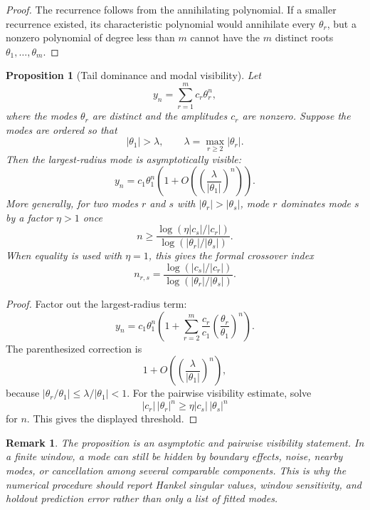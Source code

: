 \documentclass[10pt,twocolumn]{article}
\newtheorem{proposition}{Proposition}
\newtheorem{remark}{Remark}
\begin{document}
\begin{proof}
The recurrence follows from the annihilating polynomial. If a smaller
recurrence existed, its characteristic polynomial would annihilate every
\(\theta_r\), but a nonzero polynomial of degree less than \(m\) cannot have
the \(m\) distinct roots \(\theta_1,\ldots,\theta_m\).
\end{proof}

\begin{proposition}[Tail dominance and modal visibility]
Let
\[
        y_n=\sum_{r=1}^{m}c_r\theta_r^n,
\]
where the modes \(\theta_r\) are distinct and the amplitudes \(c_r\) are
nonzero. Suppose the modes are ordered so that
\[
        |\theta_1|>\lambda,
        \qquad
        \lambda=\max_{r\ge2}|\theta_r|.
\]
Then the largest-radius mode is asymptotically visible:
\[
        y_n
        =
        c_1\theta_1^n
        \left(
        1+O\left(\left(\frac{\lambda}{|\theta_1|}\right)^n\right)
        \right).
\]
More generally, for two modes \(r\) and \(s\) with
\(|\theta_r|>|\theta_s|\), mode \(r\) dominates mode \(s\) by a factor
\(\eta>1\) once
\[
        n
        \ge
        \frac{\log(\eta |c_s|/|c_r|)}
             {\log(|\theta_r|/|\theta_s|)}.
\]
When equality is used with \(\eta=1\), this gives the formal crossover index
\[
        n_{r,s}
        =
        \frac{\log(|c_s|/|c_r|)}
             {\log(|\theta_r|/|\theta_s|)}.
\]
\end{proposition}

\begin{proof}
Factor out the largest-radius term:
\[
        y_n
        =
        c_1\theta_1^n
        \left(
        1+\sum_{r=2}^{m}
        \frac{c_r}{c_1}\left(\frac{\theta_r}{\theta_1}\right)^n
        \right).
\]
The parenthesized correction is
\[
        1+O\left(\left(\frac{\lambda}{|\theta_1|}\right)^n\right),
\]
because \(|\theta_r/\theta_1|\le \lambda/|\theta_1|<1\). For the pairwise
visibility estimate, solve
\[
        |c_r|\,|\theta_r|^n
        \ge
        \eta |c_s|\,|\theta_s|^n
\]
for \(n\). This gives the displayed threshold.
\end{proof}

\begin{remark}
The proposition is an asymptotic and pairwise visibility statement. In a finite
window, a mode can still be hidden by boundary effects, noise, nearby modes,
or cancellation among several comparable components. This is why the numerical
procedure should report Hankel singular values, window sensitivity, and
holdout prediction error rather than only a list of fitted modes.
\end{remark}
\end{document}
